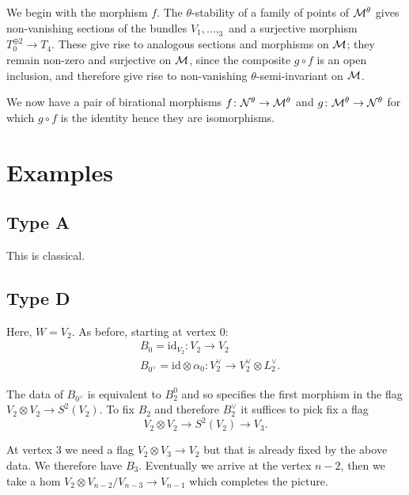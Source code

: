 \documentclass{amsart}
\theoremstyle{definition}
\begin{document}
We begin with the morphism $f$.
The $\theta$-stability of a family of points of $\mathcal{M}^\theta$ gives non-vanishing sections of the bundles $V_1, \ldots, _3$ and a surjective morphism $T_0^{\oplus 2} \rightarrow T_4$.
These give rise to analogous sections and morphisms on $\mathcal{M}$; they remain non-zero and surjective on $\mathcal{M}$, since the composite $g \circ f$ is an open inclusion, and therefore give rise to non-vanishing $\theta$-semi-invariant on $\mathcal{M}$.

We now have a pair of birational morphisms $f \colon \mathcal{N}^\theta \rightarrow \mathcal{M}^\theta$ and $g \colon \mathcal{M}^\theta \rightarrow \mathcal{N}^\theta$ for which $g \circ f$ is the identity hence they are isomorphisms.

\section{Examples}



\subsection{Type A}

This is classical.

\subsection{Type D}
Here, $W=V_2$. 
As before, starting at vertex $0$: 
\begin{align*}
    &B_0=\text{id}_{V_2} \colon V_2 \longrightarrow V_2 \\
    &B_{0^\vee} = \text{id} \otimes \alpha_0 \colon V_2^\vee \longrightarrow V_2^\vee \otimes L_2^\vee.
\end{align*}

The data of $B_{0^\vee}$ is equivalent to $B_2^0$ and so specifies the first morphism in the flag $V_2 \otimes V_2 \rightarrow S^2(V_2)$.
To fix $B_2$ and therefore $B_2^\vee$ it suffices to pick fix a flag 
$$V_2 \otimes V_2 \rightarrow S^2(V_2) \rightarrow V_3.$$

At vertex $3$ we need a flag $V_2 \otimes V_3 \rightarrow V_2$ but that is already fixed by the above data.
We therefore have $B_3$.
Eventually we arrive at the vertex ${n-2}$, then we take a hom $V_2 \otimes V_{n-2} / V_{n-3} \rightarrow V_{n-1}$ which completes the picture.




\end{document}
